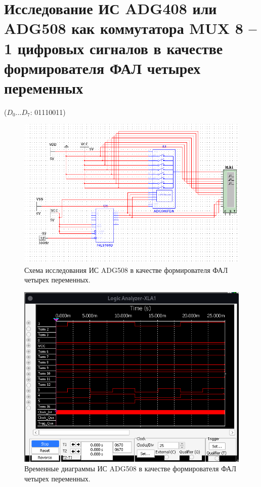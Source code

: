 \clearpage

\section{Исследование ИС ADG408 или ADG508 как
коммутатора MUX 8 – 1 цифровых сигналов в качестве
формирователя ФАЛ четырех переменных}

($D_{0}...D_{7}$: 01110011)

\begin{figure}[ht]
    \centering
    \includegraphics[width=\linewidth]{img/5.png}
    \caption{Схема исследования ИС ADG508 в качестве формирователя ФАЛ четырех переменных.}
    \label{5}
\end{figure}

\begin{figure}[ht]
    \centering
    \includegraphics[width=\linewidth]{img/6.png}
    \caption{Временные диаграммы ИС ADG508 в качестве формирователя ФАЛ четырех переменных.}
    \label{6}
\end{figure}

